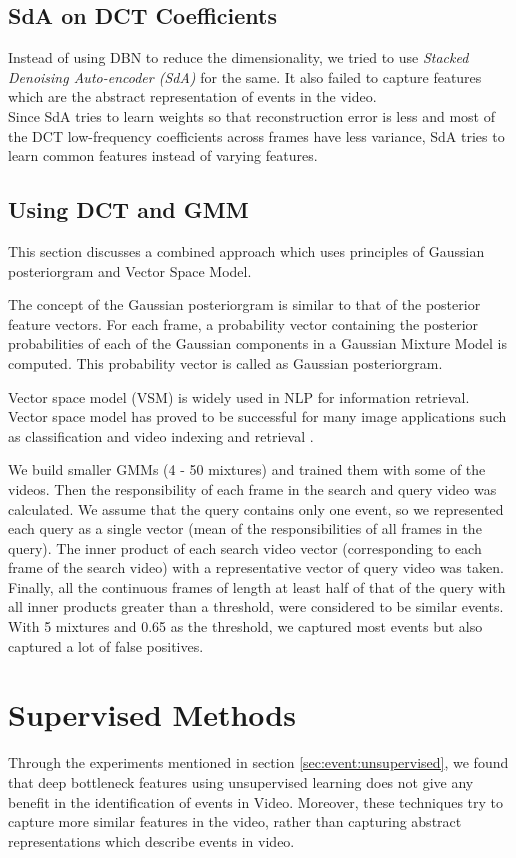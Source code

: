 \subsection{SdA on DCT Coefficients}
Instead of using DBN to reduce the dimensionality, we tried to use \textit{Stacked Denoising Auto-encoder (SdA)} for the same. It also failed to capture features which are the abstract representation of events in the video.\\
Since SdA tries to learn weights so that reconstruction error is less and most of the DCT low-frequency coefficients across frames have less variance, SdA tries to learn common features instead of varying features.\\

\subsection{Using DCT and GMM}
\label{sec:event:dct_gmm}
This section discusses a combined approach which uses principles of Gaussian posteriorgram and Vector Space Model.

The concept of the Gaussian posteriorgram is similar to that of the posterior feature vectors\citep{zhang2010towards}. For each frame, a probability vector containing the posterior probabilities of each of the Gaussian components in a Gaussian Mixture Model is computed. This probability vector is called as  Gaussian posteriorgram. 

Vector space model (VSM) is widely used in NLP for information retrieval. Vector space model has proved to be successful for many image applications such as classification and video indexing and retrieval \citep{galmar2007analysis}. 

We build smaller GMMs (4 - 50 mixtures) and trained them with some of the videos. Then the responsibility of each frame in the search and query video was calculated. We assume that the query contains only one event, so we represented each query as a single vector (mean of the responsibilities of all frames in the query). The inner product of each search video vector (corresponding to each frame of the search video) with a representative vector of query video was taken. Finally, all the continuous frames of length at least half of that of the query with all inner products greater than a threshold, were considered to be similar events. With 5 mixtures and 0.65 as the threshold, we captured most events but also captured a lot of false positives.

\section{Supervised Methods}
\label{sec:event:supervised}
Through the experiments mentioned in section  \ref{sec:event:unsupervised}, we found that deep bottleneck features using unsupervised learning does not give any benefit in the identification of events in Video. Moreover, these techniques try to capture more similar features in the video, rather than capturing abstract representations which describe events in video.

